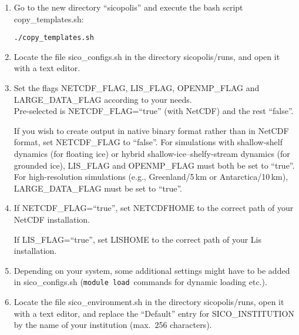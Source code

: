 \documentclass[12pt,a4paper]{article}
\begin{document}
\begin{enumerate}

\item Go to the new directory ``sicopolis'' and execute the bash script copy\_templates.sh:

\begin{small}
\hspace*{3.33mm}\verb+./copy_templates.sh+
\end{small}

\item Locate the file sico\_configs.sh in the directory sicopolis/runs, and open it with a text editor.

\item Set the flags NETCDF\_FLAG, LIS\_FLAG, OPENMP\_FLAG and LARGE\_DATA\_\-FLAG according to your needs.
\\
Pre-selected is NETCDF\_FLAG=``true'' (with NetCDF) and the rest ``false''.

If you wish to create output in native binary format rather than in NetCDF format, set NETCDF\_FLAG to ``false''. For simulations with shallow-shelf dynamics (for floating ice) or hybrid shallow-ice--shelfy-stream dynamics (for grounded ice), LIS\_FLAG and OPENMP\_FLAG must both be set to ``true''. For high-resolution simulations (e.g., Greenland/5\,km or Antarctica/10\,km), LARGE\_DATA\_FLAG must be set to ``true''.

\item If NETCDF\_FLAG=``true'', set NETCDFHOME to the correct path of your NetCDF installation.

If LIS\_FLAG=``true'', set LISHOME to the correct path of your Lis installation.

\item Depending on your system, some additional settings might have to be added in sico\_configs.sh (\verb+module load+\, commands for dynamic loading etc.).

\item Locate the file sico\_environment.sh in the directory sicopolis/runs, open it with a text editor, and replace the ``Default'' entry for SICO\_INSTITUTION by the name of your institution (max.\ 256 characters).

\end{enumerate}



\end{document}
